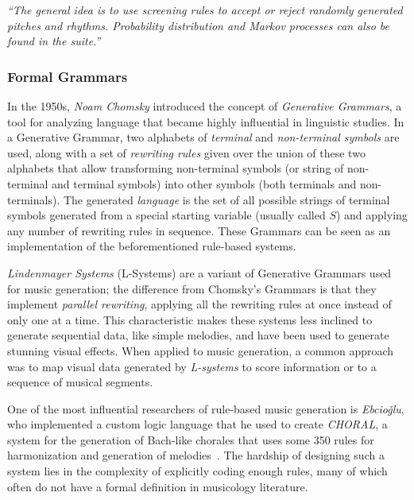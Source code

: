 \textit{``The general idea is to use screening rules to accept or reject randomly generated pitches and rhythms.
Probability distribution and Markov processes can also be found in the suite.''}~\cite{illiac-suite}

\subsubsection{Formal Grammars}\label{subsubsec:formal-grammars}

In the 1950s, \textit{Noam Chomsky} introduced the concept of \textit{Generative Grammars}, a tool for analyzing language that became highly influential in linguistic studies.
In a Generative Grammar, two alphabets of \textit{terminal} and \textit{non-terminal symbols} are used, along with a set of \textit{rewriting rules} given over the union of these two alphabets that allow transforming non-terminal symbols (or string of non-terminal and terminal symbols) into other symbols (both terminals and non-terminals).
The generated \textit{language} is the set of all possible strings of terminal symbols generated from a special starting variable (usually called $S$) and applying any number of rewriting rules in sequence.
These Grammars can be seen as an implementation of the beforementioned rule-based systems.~\cite{computational-creativity}

\textit{Lindenmayer Systems} (L-Systems) are a variant of Generative Grammars used for music generation;
the difference from Chomsky's Grammars is that they implement \textit{parallel rewriting}, applying all the rewriting rules at once instead of only one at a time.
This characteristic makes these systems less inclined to generate sequential data, like simple melodies, and have been used to generate stunning visual effects.
When applied to music generation, a common approach was to map visual data generated by \textit{L-systems} to score information or to a sequence of musical segments.~\cite{computational-creativity}

One of the most influential researchers of rule-based music generation is \textit{Ebcioǧlu}, who implemented a custom logic language that he used to create \textsl{CHORAL}, a system for the generation of Bach-like chorales that uses some 350 rules for harmonization and generation of melodies~\cite{ebcioglu}.
The hardship of designing such a system lies in the complexity of explicitly coding enough rules, many of which often do not have a formal definition in musicology literature.~\cite{computational-creativity}


